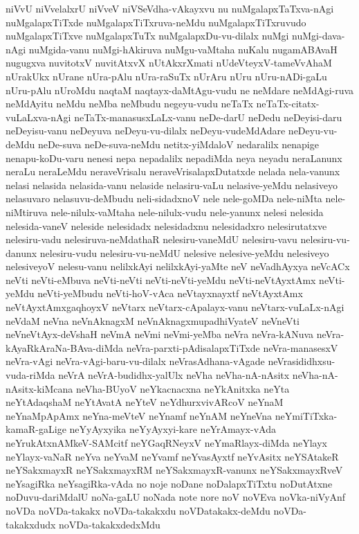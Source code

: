 {niVvU
niVvelalxrU
niVveV
niVSeVdha-vAkayxvu
nu
nuMgalapxTaTxva-nAgi
nuMgalapxTiTxde
nuMgalapxTiTxruva-neMdu
nuMgalapxTiTxruvudo
nuMgalapxTiTxve
nuMgalapxTuTx
nuMgalapxDu-vu-dilalx
nuMgi
nuMgi-dava-nAgi
nuMgida-vanu
nuMgi-hAkiruva
nuMgu-vaMtaha
nuKalu
nugamABAvaH
nugugxva
nuvitotxV
nuvitAtxvX
nUtAkxrXmati
nUdeVteyxV-tameVvAhaM
nUrakUkx
nUrane
nUra-pAlu
nUra-raSuTx
nUrAru
nUru
nUru-nADi-gaLu
nUru-pAlu
nUroMdu
naqtaM
naqtayx-daMtAgu-vudu
ne
neMdare
neMdAgi-ruva
neMdAyitu
neMdu
neMba
neMbudu
negeyu-vudu
neTaTx
neTaTx-citatx-vuLaLxva-nAgi
neTaTx-manasusxLaLx-vanu
neDe-darU
neDedu
neDeyisi-daru
neDeyisu-vanu
neDeyuva
neDeyu-vu-dilalx
neDeyu-vudeMdAdare
neDeyu-vu-deMdu
neDe-suva
neDe-suva-neMdu
netitx-yiMdaloV
nedaralilx
nenapige
nenapu-koDu-varu
nenesi
nepa
nepadalilx
nepadiMda
neya
neyadu
neraLanunx
neraLu
neraLeMdu
neraveVrisalu
neraveVrisalapxDutatxde
nelada
nela-vanunx
nelasi
nelasida
nelasida-vanu
nelaside
nelasiru-vaLu
nelasive-yeMdu
nelasiveyo
nelasuvaro
nelasuvu-deMbudu
neli-sidadxnoV
nele
nele-goMDa
nele-niMta
nele-niMtiruva
nele-nilulx-vaMtaha
nele-nilulx-vudu
nele-yanunx
nelesi
nelesida
nelesida-vaneV
neleside
nelesidadx
nelesidadxnu
nelesidadxro
nelesirutatxve
nelesiru-vadu
nelesiruva-neMdathaR
nelesiru-vaneMdU
nelesiru-vavu
nelesiru-vu-danunx
nelesiru-vudu
nelesiru-vu-neMdU
nelesive
nelesive-yeMdu
nelesiveyo
nelesiveyoV
nelesu-vanu
nelilxkAyi
nelilxkAyi-yaMte
neV
neVadhAyxya
neVcACx
neVti
neVti-eMbuva
neVti-neVti
neVti-neVti-yeMdu
neVti-neVtAyxtAmx
neVti-yeMdu
neVti-yeMbudu
neVti-hoV-vAca
neVtayxnayxtf
neVtAyxtAmx
neVtAyxtAmxgaqhoyxV
neVtarx
neVtarx-cApalayx-vanu
neVtarx-vuLaLx-nAgi
neVdaM
neVna
neVnAknagxM
neVnAknagxmupadhiVyateV
neVneVti
neVneVtAyx-deVshaH
neVmA
neVmi
neVmi-yeMba
neVra
neVra-kANuva
neVra-kAyaRkAraNa-BAva-diMda
neVra-parxti-pAdisalapxTiTxde
neVra-manasesxV
neVra-vAgi
neVra-vAgi-baru-vu-dilalx
neVrasAdhana-vAgade
neVrasididhxsu-vuda-riMda
neVrA
neVrA-budidhx-yalUlx
neVha
neVha-nA-nAsitx
neVha-nA-nAsitx-kiMcana
neVha-BUyoV
neYkacnacxna
neYkAnitxka
neYta
neYtAdaqshaM
neYtAvatA
neYteV
neYdhurxvivARcoV
neYnaM
neYnaMpApAmx
neYna-meVteV
neYnamf
neYnAM
neYneVna
neYmiTiTxka-kamaR-gaLige
neYyAyxyika
neYyAyxyi-kare
neYrAmayx-vAda
neYrukAtxnAMkeV-SAMcitf
neYGaqRNeyxV
neYmaRlayx-diMda
neYlayx
neYlayx-vaNaR
neYva
neYvaM
neYvamf
neYvasAyxtf
neYvAsitx
neYSAtakeR
neYSakxmayxR
neYSakxmayxRM
neYSakxmayxR-vanunx
neYSakxmayxRveV
neYsagiRka
neYsagiRka-vAda
no
noje
noDane
noDalapxTiTxtu
noDutAtxne
noDuvu-dariMdalU
noNa-gaLU
noNada
note
nore
noV
noVEva
noVka-niVyAnf
noVDa
noVDa-takakx
noVDa-takakxdu
noVDatakakx-deMdu
noVDa-takakxdudx
noVDa-takakxdedxMdu
}
